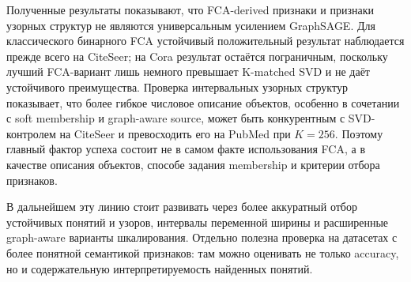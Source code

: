 \documentclass[14pt,a4paper]{extarticle}
\begin{document}
Полученные результаты показывают, что FCA-derived признаки и признаки узорных
структур не являются универсальным усилением GraphSAGE. Для классического
бинарного FCA устойчивый положительный результат наблюдается прежде всего на
CiteSeer; на Cora результат остаётся пограничным, поскольку лучший FCA-вариант
лишь немного превышает K-matched SVD и не даёт устойчивого преимущества. Проверка
интервальных узорных структур показывает, что более гибкое числовое описание
объектов, особенно в сочетании с soft membership и graph-aware source, может быть
конкурентным с SVD-контролем на CiteSeer и превосходить его на PubMed при
$K=256$. Поэтому главный фактор успеха состоит не в самом факте использования
FCA, а в качестве описания объектов, способе задания membership и критерии отбора
признаков.

В дальнейшем эту линию стоит развивать через более аккуратный отбор устойчивых
понятий и узоров, интервалы переменной ширины и расширенные graph-aware
варианты шкалирования. Отдельно полезна проверка на датасетах с более понятной
семантикой признаков: там можно оценивать не только accuracy, но и содержательную
интерпретируемость найденных понятий.

\renewcommand{\refname}{Список использованных источников}
\end{document}

